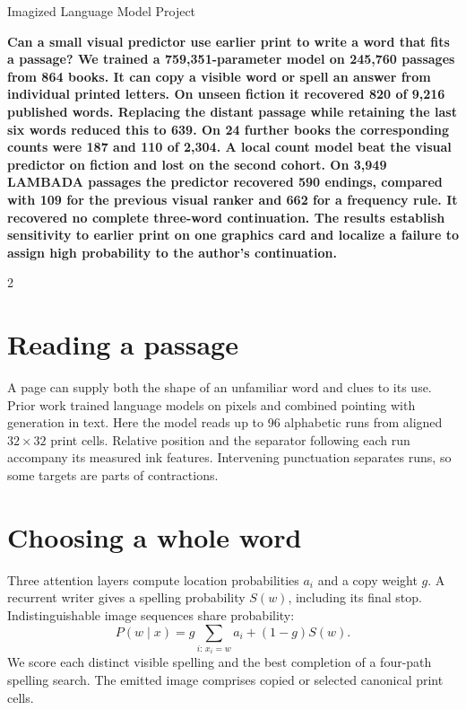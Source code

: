 \vspace{5pt}\noindent Imagized Language Model Project\par\medskip
\noindent\textbf{Can a small visual predictor use earlier print to write a word that fits a passage? We trained a 759,351-parameter model on 245,760 passages from 864 books. It can copy a visible word or spell an answer from individual printed letters. On unseen fiction it recovered 820 of 9,216 published words. Replacing the distant passage while retaining the last six words reduced this to 639. On 24 further books the corresponding counts were 187 and 110 of 2,304. A local count model beat the visual predictor on fiction and lost on the second cohort. On 3,949 LAMBADA passages the predictor recovered 590 endings, compared with 109 for the previous visual ranker and 662 for a frequency rule. It recovered no complete three-word continuation. The results establish sensitivity to earlier print on one graphics card and localize a failure to assign high probability to the author's continuation.}\par
\begin{multicols}{2}
\section*{Reading a passage}
A page can supply both the shape of an unfamiliar word and clues to its use. Prior work trained language models on pixels\cite{rust,tai,chai} and combined pointing with generation in text.\cite{pointer} Here the model reads up to 96 alphabetic runs from aligned $32\times32$ print cells. Relative position and the separator following each run accompany its measured ink features. Intervening punctuation separates runs, so some targets are parts of contractions.
\columnbreak
\section*{Choosing a whole word}
Three attention layers compute location probabilities $a_i$ and a copy weight $g$. A recurrent writer gives a spelling probability $S(w)$, including its final stop. Indistinguishable image sequences share probability:
\[
P(w\mid x)=g\!\sum_{i:\,x_i=w}\!a_i+(1-g)S(w).
\]
We score each distinct visible spelling and the best completion of a four-path spelling search. The emitted image comprises copied or selected canonical print cells.
\end{multicols}
